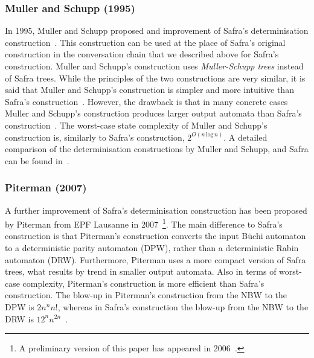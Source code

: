 \subsubsection{Muller and Schupp (1995)}
\label{2_ms95}
In 1995, Muller and Schupp proposed and improvement of Safra's determinisation construction~\cite{Muller199569}. This construction can be used at the place of Safra's original construction in the conversation chain that we described above for Safra's construction. Muller and Schupp's construction uses \textit{Muller-Schupp trees} instead of Safra trees. While the principles of the two constructions are very similar, it is said that Muller and Schupp's construction is simpler and more intuitive than Safra's construction~\cite{2002_roggenbach}. However, the drawback is that in many concrete cases Muller and Schupp's construction produces larger output automata than Safra's construction~\cite{2006_althoff}. The worst-case state complexity of Muller and Schupp's construction is, similarly to Safra's construction, $2^{O\left(n\, \text{log}\, n\right)}$.  A detailed comparison of the determinisation constructions by Muller and Schupp, and Safra can be found in~\cite{2006_althoff}.


\subsubsection{Piterman (2007)}
\label{2_pit07}
A further improvement of Safra's determinisation construction has been proposed by Piterman from EPF Lausanne in 2007~\cite{2007_piterman}\footnote{A preliminary version of this paper has appeared in 2006~\cite{2006_piterman}.}. The main difference to Safra's construction is that Piterman's construction converts the input Büchi automaton to a deterministic parity automaton (DPW), rather than a deterministic Rabin automaton (DRW). Furthermore, Piterman uses a more compact version of Safra trees, what results by trend in smaller output automata. Also in terms of worst-case complexity, Piterman's construction is more efficient than Safra's construction. The blow-up in Piterman's construction from the NBW to the DPW is $2n^nn!$, whereas in Safra's construction the blow-up from the NBW to the DRW is $12^nn^{2n}$~\cite{2006_piterman,2007_piterman}.

